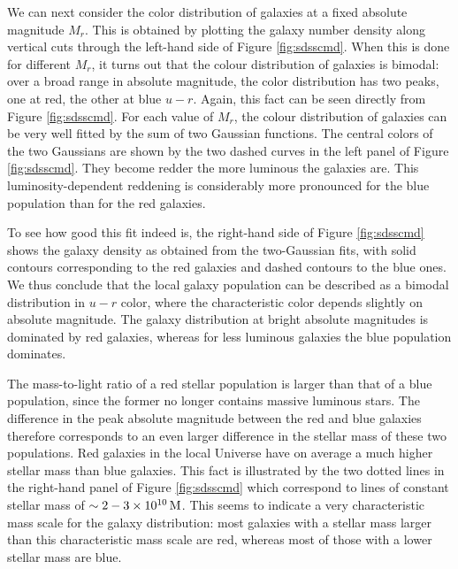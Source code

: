 \documentclass[a4paper,11pt]{article}
\begin{document}
{\noindent}We can next consider the color distribution of galaxies at a fixed absolute magnitude $M_r$. This is obtained by plotting the galaxy number density along vertical cuts through the left-hand side of Figure \ref{fig:sdsscmd}. When this is done for different $M_r$, it turns out that the colour distribution of galaxies is bimodal: over a broad range in absolute magnitude, the color distribution has two peaks, one at red, the other at blue $u-r$. Again, this fact can be seen directly from Figure \ref{fig:sdsscmd}. For each value of $M_r$, the colour distribution of galaxies can be very well fitted by the sum of two Gaussian functions. The central colors of the two Gaussians are shown by the two dashed curves in the left panel of Figure \ref{fig:sdsscmd}. They become redder the more luminous the galaxies are. This luminosity-dependent reddening is considerably more pronounced for the blue population than for the red galaxies.

{\noindent}To see how good this fit indeed is, the right-hand side of Figure \ref{fig:sdsscmd} shows the galaxy density as obtained from the two-Gaussian fits, with solid contours corresponding to the red galaxies and dashed contours to the blue ones. We thus conclude that the local galaxy population can be described as a bimodal distribution in $u-r$ color, where the characteristic color depends slightly on absolute magnitude. The galaxy distribution at bright absolute magnitudes is dominated by red galaxies, whereas for less luminous galaxies the blue population dominates.

{\noindent}The mass-to-light ratio of a red stellar population is larger than that of a blue population, since the former no longer contains massive luminous stars. The difference in the peak absolute magnitude between the red and blue galaxies therefore corresponds to an even larger difference in the stellar mass of these two populations. Red galaxies in the local Universe have on average a much higher stellar mass than blue galaxies. This fact is illustrated by the two dotted lines in the right-hand panel of Figure \ref{fig:sdsscmd} which correspond to lines of constant stellar mass of $\sim2-3\times10^{10}\,{\rm M}$. This seems to indicate a very characteristic mass scale for the galaxy distribution: most galaxies with a stellar mass larger than this characteristic mass scale are red, whereas most of those with a lower stellar mass are blue.
\end{document}
